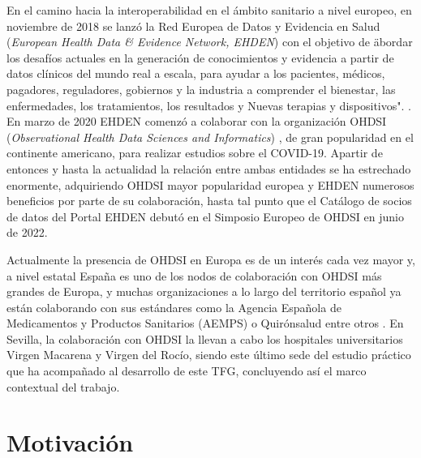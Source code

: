 En el camino hacia la interoperabilidad en el ámbito sanitario a nivel europeo, en noviembre de 2018 se lanzó la Red Europea de Datos y Evidencia en Salud (\textit{European Health Data \& Evidence Network, EHDEN}) con el objetivo de \"abordar los desafíos actuales en la generación de conocimientos y evidencia a partir de datos clínicos del mundo real a escala, para ayudar a los pacientes, médicos, pagadores, reguladores, gobiernos y la industria a comprender el bienestar, las enfermedades, los tratamientos, los resultados y Nuevas terapias y dispositivos". \cite{ehden}. En marzo de 2020 EHDEN comenzó a colaborar con la organización OHDSI (\textit{Observational Health Data Sciences and Informatics}) \cite{ohdsi}, de gran popularidad en el continente americano, para realizar estudios sobre el COVID-19. Apartir de entonces y hasta la actualidad la relación entre ambas entidades se ha estrechado enormente, adquiriendo OHDSI mayor popularidad europea y EHDEN numerosos beneficios por parte de su colaboración, hasta tal punto que el Catálogo de socios de datos del Portal EHDEN debutó en el Simposio Europeo de OHDSI en junio de 2022. 

Actualmente la presencia de OHDSI en Europa es de un interés cada vez mayor y, a nivel estatal España es uno de los nodos de colaboración con OHDSI más grandes de Europa, y muchas organizaciones a lo largo del territorio español ya están colaborando con sus estándares como la Agencia Española de Medicamentos y Productos Sanitarios (AEMPS) o Quirónsalud entre otros \cite{ohdsiSpain}. En Sevilla, la colaboración con OHDSI la llevan a cabo los hospitales universitarios Virgen Macarena y Virgen del Rocío, siendo este último sede del estudio práctico que ha acompañado al desarrollo de este TFG, concluyendo así el marco contextual del trabajo.





\section{Motivación}



